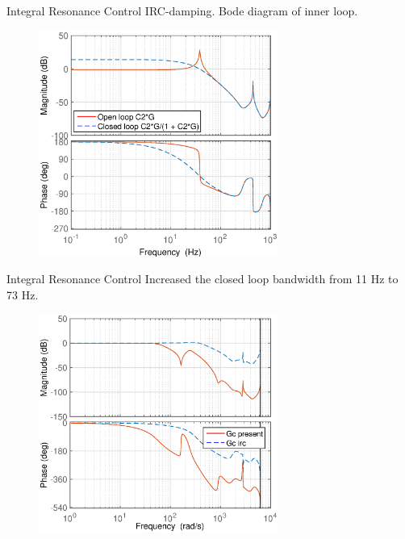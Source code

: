 \documentclass[10pt]{beamer}
\begin{document}
\begin{frame}{Integral Resonance Control}
  IRC-damping. Bode diagram of inner loop.
  \begin{figure}[h!]
    \centering
    \includegraphics[width=0.7\textwidth]{../fig/matlab/bodedamped2}
  \end{figure}
\end{frame}

\begin{frame}{Integral Resonance Control}
  Increased the closed loop bandwidth from 11 Hz to 73 Hz.
  \begin{figure}[h!]
    \centering
    \includegraphics[width=0.7\textwidth]{../fig/matlab/totalclosedloop.eps}
  \end{figure}
\end{frame}
\end{document}
